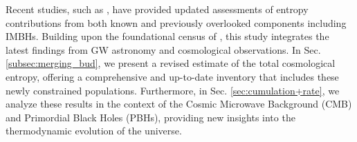 \documentclass[twocolumn]{aastex631}
\begin{document}
Recent studies, such as \cite{profumo2024newcensusuniversesentropy}, have provided updated assessments of entropy contributions from both known and previously overlooked components including IMBHs. Building upon the foundational census of \cite{Egan_2010}, this study integrates the latest findings from GW astronomy and cosmological observations. In Sec. \ref{subsec:merging_bud}, we present a revised estimate of the total cosmological entropy, offering a comprehensive and up-to-date inventory that includes these newly constrained populations. Furthermore, in Sec. \ref{sec:cumulation+rate}, we analyze these results in the context of the Cosmic Microwave Background (CMB) and Primordial Black Holes (PBHs), providing new insights into the thermodynamic evolution of the universe.




\end{document}
